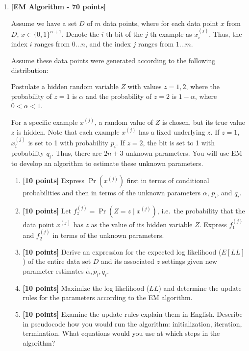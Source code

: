 \begin{enumerate}
\item {\bf [EM Algorithm - 70 points]}

Assume we have a set $D$ of $m$ data points, where for each data point $x$ from
$D$, $x\in\{0,1\}^{n+1}$.  Denote the $i$-th bit of the $j$-th example as
$x^{(j)}_{i}$.  Thus, the index $i$ ranges from $0 \ldots n$, and the index
$j$ ranges from $1 \ldots m$.

Assume these data points were generated according to the following
distribution:

Postulate a hidden random variable $Z$ with values $z = 1, 2$, where the
probability of $z=1$ is $\alpha$ and the probability of $z=2$ is $1-\alpha$,
where $0<\alpha<1$.

For a specific example $x^{(j)}$, a random value of $Z$ is chosen, but its
true value $z$ is hidden.  Note that each example $x^{(j)}$ has a fixed
underlying $z$.  If $z=1$, $x^{(j)}_i$ is set to 1 with probability $p_i$.  If
$z=2$, the bit is set to 1 with probability $q_i$.  Thus, there are $2n+3$
unknown parameters.  You will use EM to develop an algorithm to estimate these
unknown parameters.

\begin{enumerate}
\item{\bf [10 points]}
Express $\Pr(x^{(j)})$ first in terms of conditional probabilities and then in
terms of the unknown parameters $\alpha$, $p_i$, and $q_i$.

\item{\bf [10 points]}
Let $f^{(j)}_z = \Pr(Z=z\mid x^{(j)})$, i.e.\ the probability that the data
point $x^{(j)}$ has $z$ as the value of its hidden variable $Z$. Express
$f^{(j)}_1$ and $f^{(j)}_2$ in terms of the unknown parameters.

\item{\bf [10 points]}
Derive an expression for the expected log likelihood ($E[LL]$) of the entire
data set $D$ and its associated $z$ settings given new parameter estimates
$\tilde{\alpha}, \tilde{p_i}, \tilde{q_i}$.

\item{\bf [10 points]}
Maximize the log likelihood ($LL$) and determine the update rules for the
parameters according to the EM algorithm.

\item{\bf [10 points]}
Examine the update rules explain them in English.  Describe in
pseudocode how you would run the algorithm: initialization, iteration,
termination.  What equations would you use at which steps in the algorithm?


\end{enumerate}
\end{enumerate}
